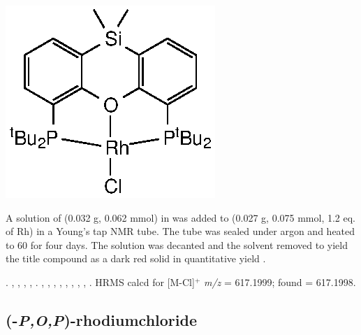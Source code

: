 \begin{structure}[h]
\begin{center}
\includegraphics{../Structures/SitBuRhCl.eps}
\end{center}
\end{structure}

A solution of \tBusixantphos{} (0.032 g, 0.062 mmol) in  was added to  (0.027 g, 0.075 mmol, 1.2 eq. of Rh) in a Young's tap NMR tube.  The tube was sealed under argon and heated to 60 \degC{} for four days.  The solution was decanted and the solvent removed  to yield the title compound as a dark red solid in quantitative yield .  

.
,
,
,
,
.
,
,
,
,
,
,
,
,
.
HRMS calcd for  [M-Cl]$^+$ \emph{m/z} = 617.1999; found = 617.1998.



\subsection*{(\tBuThixantphosk-\emph{P,O,P})-rhodiumchloride}


